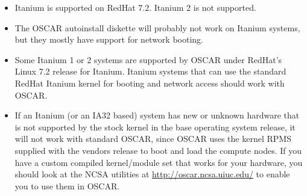 \begin{itemize}
  
\item Itanium is supported on RedHat 7.2.  Itanium 2 is not supported.
  
\item The OSCAR autoinstall diskette will probably not work on Itanium
  systems, but they mostly have support for network booting.
  
\item Some Itanium 1 or 2 systems are supported by OSCAR under
  RedHat's Linux 7.2 release for Itanium.  Itanium systems that can
  use the standard RedHat Itanium kernel for booting and network
  access should work with OSCAR.
  
\item If an Itanium (or an IA32 based) system has new or unknown
  hardware that is not supported by the stock kernel in the base
  operating system release, it will not work with standard OSCAR,
  since OSCAR uses the kernel RPMS supplied with the vendors release
  to boot and load the compute nodes.  If you have a custom compiled
  kernel/module set that works for your hardware, you should look at
  the NCSA utilities at \url{http://oscar.ncsa.uiuc.edu/} to
  enable you to use them in OSCAR.
\end{itemize}




